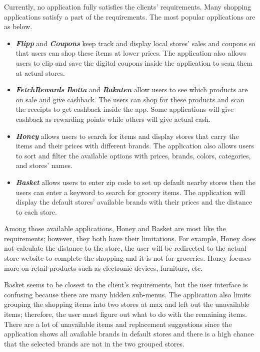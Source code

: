 Currently, no application fully satisfies the clients' requirements. Many shopping applications satisfy a part of the requirements. The most popular applications are as below.
\begin{itemize}
    \item \textbf{\emph{Flipp}} \cite{Flipp} and \textbf{\emph{Coupons}}\cite{Coupons} keep track and display local stores' sales and coupons so that users can shop these items at lower prices. The application also allows users to clip and save the digital coupons inside the application to scan them at actual stores. 

    \item \textbf{\emph{FetchRewards}}\cite{Fetch} \textbf{\emph{Ibotta}}\cite{Ibotta} and \textbf{\emph{Rakuten}}\cite{Rakuten} allow users to see which products are on sale and give cashback. The users can shop for these products and scan the receipts to get cashback inside the app. Some applications will give cashback as rewarding points while others will give actual cash. 

    \item \textbf{\emph{Honey}}\cite{Honey} allows users to search for items and display stores that carry the items and their prices with different brands. The application also allows users to sort and filter the available options with prices, brands, colors, categories, and stores' names. 

    \item \textbf{\emph{Basket}}\cite{Basket} allows users to enter zip code to set up default nearby stores then the users can enter a keyword to search for grocery items. The application will display the default stores' available brands with their prices and the distance to each store.
\end{itemize}
Among those available applications, Honey and Basket are most like the requirements; however, they both have their limitations. For example, Honey does not calculate the distance to the store, the user will be redirected to the actual store website to complete the shopping and it is not for groceries. Honey focuses more on retail products such as electronic devices, furniture, etc.

Basket seems to be closest to the client's requirements, but the user interface is confusing because there are many hidden sub-menus.  The application also limits grouping the shopping items into two stores at max and left out the unavailable items; therefore, the user must figure out what to do with the remaining items. There are a lot of unavailable items and replacement suggestions since the application shows all available brands in default stores and there is a high chance that the selected brands are not in the two grouped stores.

